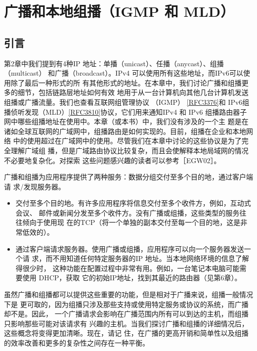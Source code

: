 \chapter{广播和本地组播（IGMP 和 MLD）}
\minitoc

\minitoc
\section{引言}
第2章中我们提到有4种IP 地址：单播（unicast）、任播（anycast）、组播（multicast）
和广播（broadcast）。IPv4 可以使用所有这些地址，而IPv6可以使用除了最后一种形式的所
有其他形式的地址。在本章中，我们讨论广播和组播更多的细节，包括链路层地址如何有效
地用于从一台计算机向其他几台计算机发送组播或广播流量。我们也查看互联网组管理协议
（IGMP） \href{https://www.rfc-editor.org/rfc/rfc3376}{[RFC3376]}和 IPv6组播侦听发现（MLD）\href{https://www.rfc-editor.org/rfc/rfc3810}{[RFC3810]}协议，它们用来通知IPv4 和
IPv6 组播路由器子网中哪些组播地址在使用中。本章（或本书）中，我们没有涉及的一个主
题是在诸如全球互联网的广域网中，组播路由是如何实现的。目前，组播在企业和本地网络
中的使用超过在广域网中的使用。尽管我们在本章中讨论的这些协议是为了完全理解广域组
播，但是广域路由协议比较复杂，而且会使解释本地局域网的情况不必要地复杂化。对探索
这些问题感兴趣的读者可以参考［EGW02］。

广播和组播为应用程序提供了两种服务：数据分组交付至多个目的地，通过客户端请
求/发现服务器。

\begin{itemize}
    \item 交付至多个目的地。有许多应用程序将信息交付至多个收件方，例如，互动式会议、
    邮件或新闻分发至多个收件方。没有广播或组播，这些类型的服务往往倾向于使用现
    在的TCP（将一个单独的副本交付至每一个目的地，这是非常低效的）。
    \item 通过客户端请求服务器。使用广播或组播，应用程序可以向一个服务器发送一个请
    求，而不用知道任何特定服务器的IP 地址。当本地网络环境的信息了解得很少时，
    这种功能在配置过程中非常有用。例如，一台笔记本电脑可能需要使用 DHCP，获取
    它的初始IP地址，找到其最近的路由器（见第6章）。
\end{itemize}

虽然广播和组播都可以提供这些重要的功能，但是相对于广播来说，组播一般情况下是
更可取的，因为组播只涉及那些支持或使用特定服务或协议的系统，而广播却不是。因此，
一个广播请求会影响在广播范围内所有可以到达的主机，而组播只影响那些可能对该请求有
兴趣的主机。当我们探讨广播和组播的详细情况后，这些概念将变得更加清晰。现在，请记
住，在广播的更高开销和简单性以及组播的效率改善和更多的复杂性之间存在一种平衡。

